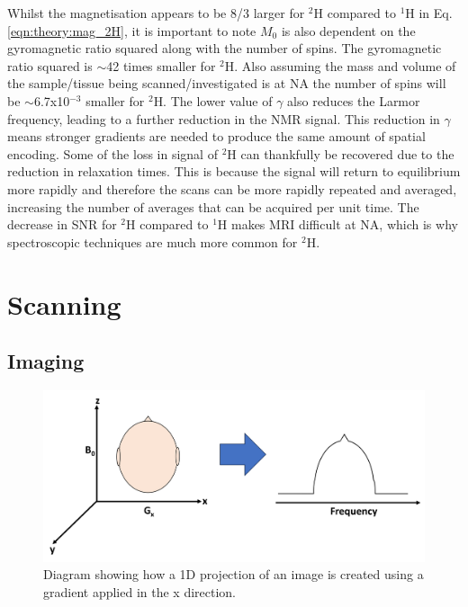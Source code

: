 Whilst the magnetisation appears to be 8/3 larger for $^2$H compared to $^1$H in Eq. \ref{eqn:theory:mag_2H}, it is important to note $M_0$ is also dependent on the gyromagnetic ratio squared along with the number of spins. The gyromagnetic ratio squared is $\sim$42 times smaller for $^2$H. Also assuming the mass and volume of the sample/tissue being scanned/investigated is at \ac{NA} the number of spins will be $\sim$6.7x10$^{-3}$ smaller for $^2$H. The lower value of $\gamma$ also reduces the Larmor frequency, leading to a further reduction in the NMR signal. This reduction in $\gamma$ means stronger gradients are needed to produce the same amount of spatial encoding. Some of the loss in signal of $^2$H can thankfully be recovered due to the reduction in relaxation times. This is because the signal will return to equilibrium more rapidly and therefore the scans can be more rapidly repeated and averaged, increasing the number of averages that can be acquired per unit time. The decrease in \ac{SNR} for $^2$H compared to $^1$H makes \ac{MRI} difficult at \ac{NA}, which is why spectroscopic techniques are much more common for $^2$H. 


\section{Scanning}   

\subsection{Imaging}

\begin{figure}
    \centering
    \includegraphics[width=1\textwidth]{Figures/Theory/1D_Projection.png}
    \caption{Diagram showing how a 1D projection of an image is created using a gradient applied in the x direction.}
    \label{fig:theory:1D}
\end{figure}

